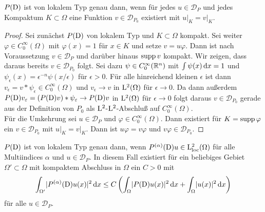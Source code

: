\begin{lem}
$P(\mathrm D)$ ist von lokalem Typ genau dann, wenn für jedes $u\in\mathcal{D}_P$ und jedes Kompaktum $K\subset\Omega$ eine Funktion $v\in\mathcal{D}_{P_0}$ existiert mit $u\vert_K=v\vert_K$.
\end{lem}
\begin{proof}
Sei zunächst $P(\mathrm D)$ von lokalem Typ und $K\subset\Omega$ kompakt. Sei weiter $\varphi\in C_0^\infty(\Omega)$ mit $\varphi(x)=1$ für $x\in K$ und setze $v=u\varphi$. Dann ist nach Voraussetzung $v\in\mathcal{D}_P$ und darüber hinaus $\operatorname{supp} v$ kompakt. Wir zeigen, dass daraus bereits $v\in\mathcal{D}_{P_0}$ folgt. Sei dazu $\psi \in C_0^\infty(\mathbb R^n)$ mit $\int\psi(x)\,\mathrm d x=1$ und $\psi_\epsilon(x)=\epsilon^{-n} \psi(x/\epsilon)$ für $\epsilon>0$. Für alle hinreichend kleinen $\epsilon$ ist dann $v_\epsilon=v*\psi_\epsilon\in C_0^\infty(\Omega)$ und $v_\epsilon \to v$ in $\mathrm L^2(\Omega)$ für $\epsilon\to 0$. Da dann außerdem $P(\mathrm D)v_\varepsilon=(P(\mathrm D)v)*\psi_\varepsilon \to P(\mathrm D)v$ in $\mathrm L^2(\Omega)$ für $\epsilon\to 0$ folgt daraus $v\in \mathcal{D}_{P_0}$ gerade aus der Definition von $P_0$ als $\mathrm L^2$-$\mathrm L^2$-Abschluß auf $C_0^\infty(\Omega)$.\\
Für die Umkehrung sei $u\in\mathcal{D}_P$ und $\varphi\in C_0^\infty(\Omega)$. Dann existiert für $K=\operatorname{supp} \varphi$ ein $v\in\mathcal{D}_{P_0}$ mit $u\vert_K=v\vert_K$. Dann ist $u\varphi=v\varphi $ und $v\varphi\in\mathcal{D}_{P_0}$. %
\end{proof}
\begin{lem}\label{lem : loktyp}
$P(\mathrm D)$ ist von lokalem Typ genau dann, wenn $P^{(\alpha)}(\mathrm D)u \in \mathrm L^2_{\text{loc}}(\Omega)$ für alle Multiindices $\alpha$ und $u\in\mathcal{D}_P$. In diesem Fall existiert für ein beliebiges Gebiet $\Omega'\subset \Omega$ mit kompaktem Abschluss in $\Omega$ ein $C>0$ mit
\begin{equation}
\int_{\Omega'} \lvert P^{(\alpha)}(\mathrm D)u(x)\rvert^2\,\mathrm d x\leq C\left( \int_{\Omega} \lvert P(\mathrm D)u(x)\rvert^2\,\mathrm d x + \int_{\Omega} \lvert u(x)\rvert^2 \,\mathrm d x \right) \label{eq:lm3.4}
\end{equation}
für alle $u\in\mathcal{D}_P$.
\end{lem}
